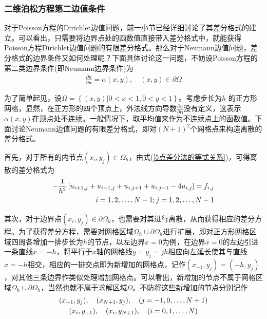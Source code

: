         \subsubsection{二维泊松方程第二边值条件}
            对于Poisson方程的Dirichlet边值问题，前一小节已经详细讨论了其差分格式的建立。可以看出，只需要将边界点处的函数值直接带入差分格式中，就能获得Poisson方程Dirichlet边值问题的有限差分格式。那么对于Neumann边值问题，差分格式的边界条件又如何处理呢？下面具体讨论这一问题，不妨设Poisson方程的第二类边界条件(即Neumann边界条件)为
            \begin{align*}
            \frac{\partial u}{\partial \mathbf{n}} = \alpha ( x,y),\quad ( x,y ) \in \partial \Omega
            \end{align*}
            \par
            为了简单起见，设$\Omega  = \left\{ {\left( {x,y} \right)\left| {0 < x < 1,0 < y < 1} \right.} \right\}$。考虑步长为$h$ 的正方形网格，显然，在正方形的四个顶点上，外法线方向导数$\frac{{\partial u}}{{\partial \mathbf{n}}} $没有定义，这表示$\alpha(x,y)$在顶点处不连续。一般情况下，取平均值来作为不连续点上的函数值。下面讨论Neumann边值问题的有限差分格式，即对$(N+1)^2$个网格点来构造离散的差分格式。
            \par
            首先，对于所有的内节点$(x_i,y_j) \in {\Omega _h}$，由式(\ref{5点差分法的等式关系})，可得离散的差分格式为
            \begin{align}\label{eq:离散差分格式}
             - \frac{1}{{{h^2}}}\left[ {{u_{i + 1,j}} + {u_{i - 1,j}} + {u_{i,j + 1}} + {u_{i,j - 1}} - 4{u_{i,j}}} \right] = {f_{i,j}}\notag\\
             i=1,2,\ldots,N-1; j=1,2,\ldots,N-1
            \end{align}
             \par
             其次，对于边界点$(x_i,y_j) \in {\partial \Omega _h}$，也需要对其进行离散，从而获得相应的差分方程。为了获得差分方程，需要对网格区域${\Omega _h}\cup {\partial \Omega _h} $进行扩展，即对正方形网格区域四周各增加一排步长为$h$的节点，以左边界$x=0$为例，在边界$x=0$的左边引进一条直线$x=-h$，将平行于$x$轴的网格线$y=y_j=jh$相应向左延长使其与直线$x=-h$相交，相应的一排交点即为新增加的网格点，记作$(x_{-1},y_j)=(-h,y_j)$，对其他三条边界作类似处理增加网格点。可以看出，新增加的节点不属于网格区域${\Omega _h}\cup {\partial \Omega _h} $，当然也就不属于求解区域$\Omega$。不防将这些新增加的节点分别记作
             \begin{gather}
             (x_{-1},y_j),\quad (x_{N+1},y_j),\quad (j=-1,0,\ldots,N+1)\notag\\
             (x_{i},y_{-1}),\quad (x_{i},y_{N+1}),\quad (i=0,1,\ldots,N)\notag
             \end{gather}

